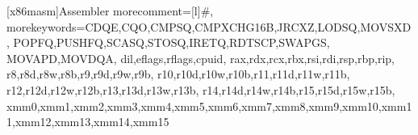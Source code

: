 \lstset{
  language=[11]C++, %
  escapechar=|, %
}

[x86masm]{Assembler} %
{morecomment=[l]{\#},
  morekeywords={CDQE,CQO,CMPSQ,CMPXCHG16B,JRCXZ,LODSQ,MOVSXD,%
    POPFQ,PUSHFQ,SCASQ,STOSQ,IRETQ,RDTSCP,SWAPGS,%
    MOVAPD,MOVDQA,%
    dil,eflags,rflags,cpuid,%
    rax,rdx,rcx,rbx,rsi,rdi,rsp,rbp,rip,%
    r8,r8d,r8w,r8b,r9,r9d,r9w,r9b,%
    r10,r10d,r10w,r10b,r11,r11d,r11w,r11b,%
    r12,r12d,r12w,r12b,r13,r13d,r13w,r13b,%
    r14,r14d,r14w,r14b,r15,r15d,r15w,r15b,%
    xmm0,xmm1,xmm2,xmm3,xmm4,xmm5,xmm6,xmm7,xmm8,xmm9,xmm10,xmm11,xmm12,xmm13,xmm14,xmm15%
}} %

\newcommand*\inlineasm[1]{\lstinline[style=x64]|#1|}
\newcommand*\inlinehaskell[1]{\lstinline[style=Haskell]|#1|}
